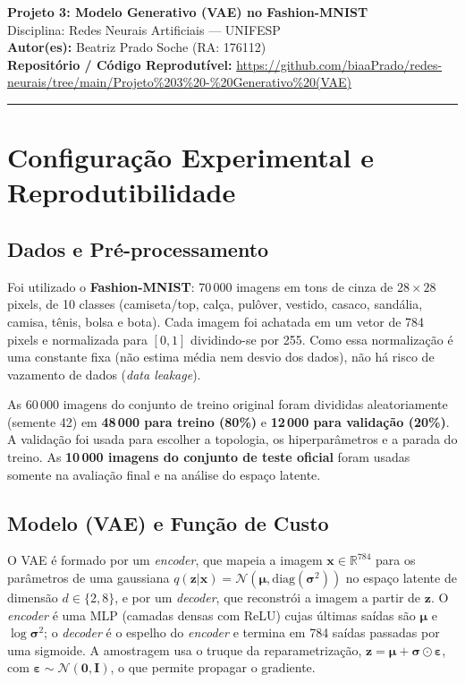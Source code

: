 \documentclass[11pt,a4paper]{article}
\begin{document}
\begin{center}
    {\LARGE \textbf{Projeto 3: Modelo Generativo (VAE) no Fashion-MNIST}} \\[0.35em]
    {\large Disciplina: Redes Neurais Artificiais --- UNIFESP} \\[0.3em]
    \textbf{Autor(es):} Beatriz Prado Soche (RA: 176112) \\[0.2em]
    \textbf{Repositório / Código Reprodutível:} \url{https://github.com/biaaPrado/redes-neurais/tree/main/Projeto%203%20-%20Generativo%20(VAE)}
\end{center}
\vspace{-0.5em}
\hrule
\vspace{0.8em}

\section{Configuração Experimental e Reprodutibilidade}

\subsection{Dados e Pré-processamento}
Foi utilizado o \textbf{Fashion-MNIST}: 70\,000 imagens em tons de cinza de $28\times28$ pixels, de 10 classes (camiseta/top, calça, pulôver, vestido, casaco, sandália, camisa, tênis, bolsa e bota). Cada imagem foi achatada em um vetor de 784 pixels e normalizada para $[0,1]$ dividindo-se por 255. Como essa normalização é uma constante fixa (não estima média nem desvio dos dados), não há risco de vazamento de dados (\textit{data leakage}).

As 60\,000 imagens do conjunto de treino original foram divididas aleatoriamente (semente 42) em \textbf{48\,000 para treino (80\%)} e \textbf{12\,000 para validação (20\%)}. A validação foi usada para escolher a topologia, os hiperparâmetros e a parada do treino. As \textbf{10\,000 imagens do conjunto de teste oficial} foram usadas somente na avaliação final e na análise do espaço latente.

\subsection{Modelo (VAE) e Função de Custo}
O VAE é formado por um \textit{encoder}, que mapeia a imagem $\mathbf{x}\in\mathbb{R}^{784}$ para os parâmetros de uma gaussiana $q(\mathbf{z}|\mathbf{x})=\mathcal{N}(\boldsymbol{\mu},\mathrm{diag}(\boldsymbol{\sigma}^2))$ no espaço latente de dimensão $d\in\{2,8\}$, e por um \textit{decoder}, que reconstrói a imagem a partir de $\mathbf{z}$. O \textit{encoder} é uma MLP (camadas densas com ReLU) cujas últimas saídas são $\boldsymbol{\mu}$ e $\log\boldsymbol{\sigma}^2$; o \textit{decoder} é o espelho do \textit{encoder} e termina em 784 saídas passadas por uma sigmoide. A amostragem usa o truque da reparametrização, $\mathbf{z}=\boldsymbol{\mu}+\boldsymbol{\sigma}\odot\boldsymbol{\varepsilon}$, com $\boldsymbol{\varepsilon}\sim\mathcal{N}(\mathbf{0},\mathbf{I})$, o que permite propagar o gradiente.
\end{document}
